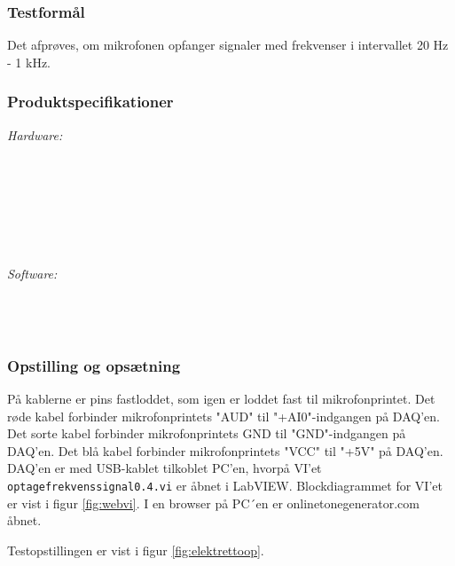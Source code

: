 		\subsubsection{Testformål}
		Det afprøves, om mikrofonen opfanger signaler med frekvenser i intervallet 20 Hz - 1 kHz.
		
		\subsubsection{Produktspecifikationer}
	
			\textit{Hardware:}\\
			\elektretto\\
			\pinstre\\
			\mikrofonkabel\\
			\krympeflex\\
			\daq\\
			\daqusb\\			
			\PC\\
	
			\textit{Software:}\\
			\labview\\
			\daqsoft\\
			\onlineg\\

	
		\subsubsection{Opstilling og opsætning}
		På kablerne er pins fastloddet, som igen er loddet fast til mikrofonprintet. Det røde kabel forbinder mikrofonprintets "AUD" til "+AI0"-indgangen på DAQ'en. Det sorte kabel forbinder mikrofonprintets GND til "GND"-indgangen på DAQ'en. Det blå kabel forbinder mikrofonprintets "VCC" til "+5V" på DAQ'en. DAQ'en er med USB-kablet tilkoblet PC'en, hvorpå VI'et \texttt{optagefrekvenssignal0.4.vi} er åbnet i LabVIEW. Blockdiagrammet for VI'et er vist i figur \ref{fig:webvi}. I en browser på PC´en er onlinetonegenerator.com åbnet.       
		
		Testopstillingen er vist i figur \ref{fig:elektrettoop}.\\
		
